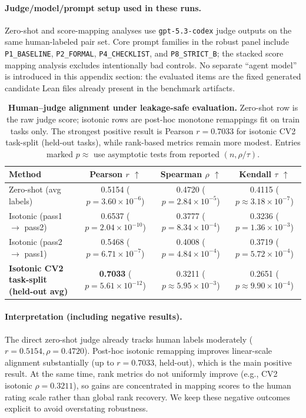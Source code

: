 \documentclass{article}
\begin{document}
\paragraph{Judge/model/prompt setup used in these runs.}
Zero-shot and score-mapping analyses use \texttt{gpt-5.3-codex} judge outputs on the same human-labeled pair set.
Core prompt families in the robust panel include \texttt{P1\_BASELINE}, \texttt{P2\_FORMAL}, \texttt{P4\_CHECKLIST}, and \texttt{P8\_STRICT\_B}; the stacked score mapping analysis excludes intentionally bad controls.
No separate ``agent model'' is introduced in this appendix section: the evaluated items are the fixed generated candidate Lean files already present in the benchmark artifacts.

\begin{table}[t]
  \centering
  \small
  \begin{tabular}{lccc}
    \toprule
    \textbf{Method} & \textbf{Pearson \(r\) \(\uparrow\)} & \textbf{Spearman \(\rho\) \(\uparrow\)} & \textbf{Kendall \(\tau\) \(\uparrow\)} \\
    \midrule
    Zero-shot (avg labels) & 0.5154 (\(p=3.60\times10^{-6}\)) & 0.4720 (\(p=2.84\times10^{-5}\)) & 0.4115 (\(p\approx3.18\times10^{-7}\)) \\
    Isotonic (pass1 \(\rightarrow\) pass2) & 0.6537 (\(p=2.04\times10^{-10}\)) & 0.3777 (\(p=8.34\times10^{-4}\)) & 0.3236 (\(p=1.36\times10^{-3}\)) \\
    Isotonic (pass2 \(\rightarrow\) pass1) & 0.5468 (\(p=6.71\times10^{-7}\)) & 0.4008 (\(p=4.84\times10^{-4}\)) & 0.3719 (\(p=5.72\times10^{-4}\)) \\
    \textbf{Isotonic CV2 task-split (held-out avg)} & \textbf{0.7033} (\(p=5.61\times10^{-12}\)) & 0.3211 (\(p\approx5.95\times10^{-3}\)) & 0.2651 (\(p\approx9.90\times10^{-4}\)) \\
    \bottomrule
  \end{tabular}
  \caption{\textbf{Human--judge alignment under leakage-safe evaluation.}
  Zero-shot row is the raw judge score; isotonic rows are post-hoc monotone remappings fit on train tasks only.
  The strongest positive result is Pearson \(r=0.7033\) for isotonic CV2 task-split (held-out tasks), while rank-based metrics remain more modest.
  Entries marked \(p\approx\) use asymptotic tests from reported \((n,\rho/\tau)\).}
  \label{tab:human_judge_alignment}
\end{table}

\paragraph{Interpretation (including negative results).}
The direct zero-shot judge already tracks human labels moderately (\(r=0.5154,\rho=0.4720\)).
Post-hoc isotonic remapping improves linear-scale alignment substantially (up to \(r=0.7033\), held-out), which is the main positive result.
At the same time, rank metrics do not uniformly improve (e.g., CV2 isotonic \(\rho=0.3211\)), so gains are concentrated in mapping scores to the human rating scale rather than global rank recovery.
We keep these negative outcomes explicit to avoid overstating robustness.
\end{document}
